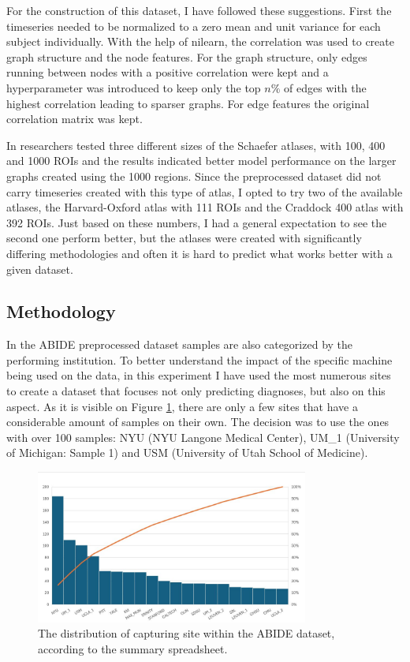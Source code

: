 	For the construction of this dataset, I have followed these suggestions. First the timeseries needed to be normalized to a zero mean and unit variance for each subject individually. With the help of nilearn, the correlation was used to create graph structure and the node features. For the graph structure, only edges running between nodes with a positive correlation were kept and a hyperparameter was introduced to keep only the top $n\%$ of edges with the highest correlation leading to sparser graphs. For edge features the original correlation matrix was kept.
	
	In \cite{said2023neurograph} researchers tested three different sizes of the Schaefer atlases\cite{schaefer2018local}, with 100, 400 and 1000 ROIs and the results indicated better model performance on the larger graphs created using the 1000 regions. Since the preprocessed dataset did not carry timeseries created with this type of atlas, I opted to try two of the available atlases, the Harvard-Oxford atlas\cite{desikan2006automated} with 111 ROIs and the Craddock 400 atlas\cite{craddock2012whole} with 392 ROIs. Just based on these numbers, I had a general expectation to see the second one perform better, but the atlases were created with significantly differing methodologies and often it is hard to predict what works better with a given dataset.
	
	\subsection{Methodology}
	
	In the ABIDE preprocessed dataset samples are also categorized by the performing institution. To better understand the impact of the specific machine being used on the data, in this experiment I have used the most numerous sites to create a dataset that focuses not only predicting diagnoses, but also on this aspect. As it is visible on Figure \ref{fig:distribution}, there are only a few sites that have a considerable amount of samples on their own. The decision was to use the ones with over 100 samples: NYU (NYU Langone Medical Center), UM\_1 (University of Michigan: Sample 1) and USM (University of Utah School of Medicine).
	
	\begin{figure}[!h]
		\centering
		\label{fig:distribution}
		\includegraphics[width=0.8\textwidth]{figures/ABIDE-sites.jpg}
		\caption{The distribution of capturing site within the ABIDE dataset, according to the summary spreadsheet.}
	\end{figure}
	
